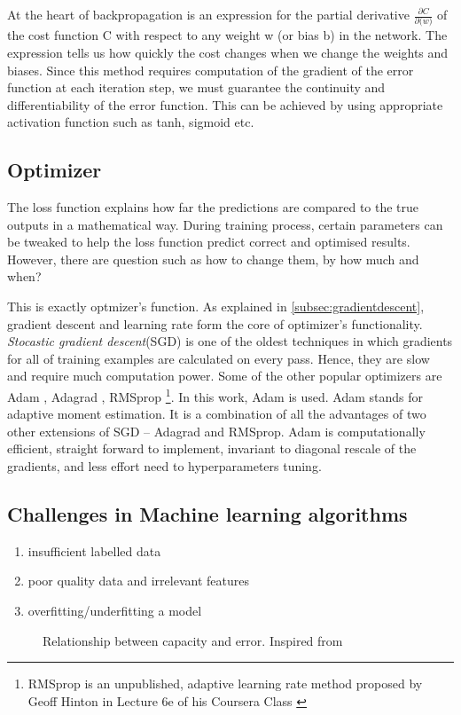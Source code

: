 At the heart of backpropagation is an expression for the partial derivative
$\frac{\partial C}{\partial \mathbf(w)}$ of the cost function C with respect to any weight w (or bias b) in the network. The expression tells us how quickly the cost changes when we change the weights and biases.
Since this method requires computation of the gradient of the error function at each
iteration step, we must guarantee the continuity and differentiability of the error
function. This can be achieved by using appropriate activation function such as tanh,
sigmoid etc.


\subsection{Optimizer}
\label{subsec:optimizer}
The loss function explains how far the predictions are compared to the true
outputs in a mathematical way. During training process, certain parameters can be tweaked
to help the loss function predict correct and optimised results. However, there are
question such as how to change them, by how much and when?

This is exactly optmizer's function. As explained in \ref{subsec:gradientdescent}, gradient
descent and learning rate form the core of optimizer's functionality. \textit{Stocastic
gradient descent}(SGD) is one of the oldest techniques in which gradients for all of
training examples are calculated on every pass. Hence, they are slow
and require much computation power. Some of the other popular optimizers are Adam
\cite{kingma2014adam}, Adagrad \cite{adagradpaper}, RMSprop \footnote{RMSprop is an unpublished, adaptive learning rate
method proposed by Geoff Hinton in Lecture 6e of his Coursera Class \cite{RMSProp}}. In this work, Adam is used. Adam stands for adaptive moment estimation.
It is a combination of all the advantages of two other extensions of SGD -- Adagrad and
RMSprop. Adam is computationally efficient, straight forward to implement, invariant to
diagonal rescale of the gradients, and less effort need to hyperparameters tuning.

\subsection{Challenges in Machine learning algorithms}
\begin{enumerate}
    \item insufficient labelled data
    \item poor quality data and irrelevant features
    \item overfitting/underfitting a model
\end{enumerate}
\begin{figure}[h]
	\centering
    \def\svgwidth{0.8\textwidth}
    \caption{Relationship between capacity and error. Inspired from
    \cite{Goodfellow-et-al-2016}}
    \label{fig:overfittingunderfitting}
\end{figure}

